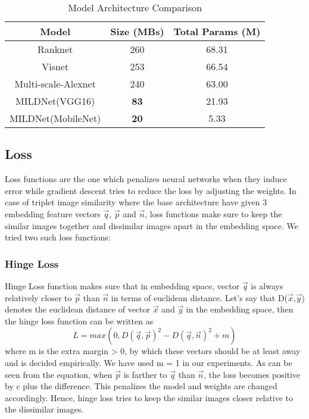 \documentclass[10pt,twocolumn,letterpaper]{article}
\begin{document}
\begin{table}[h]
\caption{Model Architecture Comparison}
\label{model_arch_comparison}
\begin{center}
\begin{tabular}{|c||c|c|}
\hline
Model & Size (MBs) & Total Params (M)\\
\hline
\hline
Ranknet\cite{c3} & 260 & 68.31\\
\hline
Visnet\cite{c2} & 253 & 66.54\\
\hline
Multi-scale-Alexnet\cite{c1} & 240 & 63.00\\
\hline
MILDNet(VGG16) & \textbf{83} & 21.93\\
\hline
MILDNet(MobileNet) & \textbf{20} & 5.33\\
\hline
\end{tabular}
\end{center}
\end{table}

\subsection{Loss}
Loss functions are the one which penalizes neural networks when they induce error while gradient descent tries to reduce the loss by adjusting the weights. In case of triplet image similarity where the base architecture have given 3 embedding feature vectors $\Vec{q}$, $\Vec{p}$ and $\Vec{n}$, loss functions make sure to keep the similar images together and dissimilar images apart in the embedding space. We tried two such loss functions: 
\subsubsection{Hinge Loss}
Hinge Loss function makes sure that in embedding space, vector $\Vec{q}$ is always relatively closer to $\Vec{p}$ than $\Vec{n}$ in terms of euclidean distance. Let's say that D($\Vec{x}$,$\Vec{y}$) denotes the euclidean distance of vector $\Vec{x}$ and $\Vec{y}$ in the embedding space, then the hinge loss function can be written as
\begin{equation}
 L = max(0, D(\Vec{q},\Vec{p})^2 - D(\Vec{q},\Vec{n})^2 + m)
\end{equation}
where m is the extra margin > 0, by which these vectors should be at least away and is decided empirically. We have used m = 1 in our experiments. 
As can be seen from the equation, when $\Vec{p}$ is farther to $\Vec{q}$ than $\Vec{n}$, the loss becomes positive by c plus the difference. This penalizes the model and weights are changed accordingly. Hence, hinge loss tries to keep the similar images closer relative to the dissimilar images.
\end{document}
